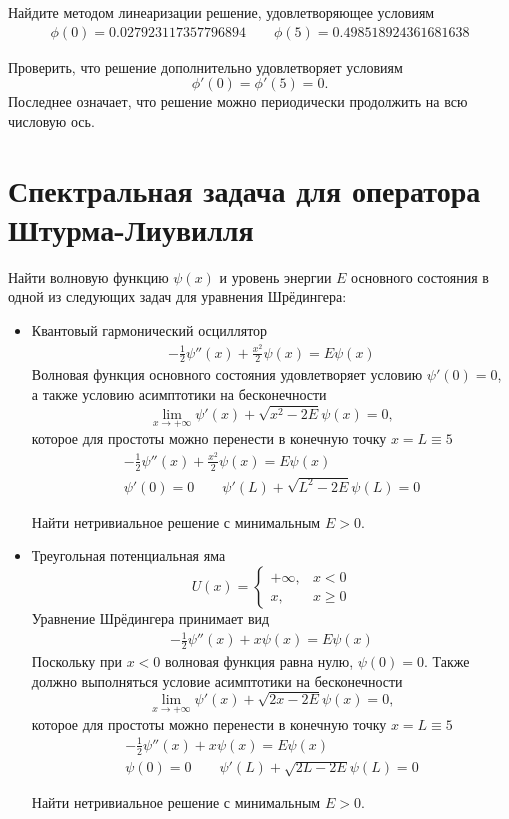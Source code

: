 \documentclass[10pt]{article}
\begin{document}
Найдите методом линеаризации решение, удовлетворяющее условиям
\begin{gather*}
\phi(0) = 0.027923117357796894 \qquad
\phi(5) = 0.498518924361681638
\end{gather*}

Проверить, что решение дополнительно удовлетворяет условиям \[\phi'(0) =
\phi'(5) = 0.\]
Последнее означает, что решение можно периодически продолжить на всю числовую
ось.

\section{Спектральная задача для оператора Штурма-Лиувилля}
Найти волновую функцию $\psi(x)$ и уровень энергии $E$ основного состояния в одной из следующих
задач для уравнения Шрёдингера:
\begin{itemize}
\item Квантовый гармонический осциллятор
\begin{gather*}
-\frac{1}{2}\psi''(x) + \frac{x^2}{2} \psi(x) = E\psi(x)
\end{gather*}
Волновая функция основного состояния удовлетворяет условию $\psi'(0) = 0$, а
также условию асимптотики на бесконечности
\[
\lim_{x\rightarrow +\infty} \psi'(x) + \sqrt{x^2 - 2E} \psi(x) = 0,
\]
которое для простоты можно перенести в конечную точку $x = L \equiv 5$
\begin{gather*}
-\frac{1}{2}\psi''(x) + \frac{x^2}{2} \psi(x) = E\psi(x)\\
\psi'(0) = 0\qquad
\psi'(L) + \sqrt{L^2 - 2E} \psi(L) = 0
\end{gather*}

Найти нетривиальное решение с минимальным $E > 0$.
\item Треугольная потенциальная яма
\[
U(x) = 
\begin{cases}
+\infty, &x < 0\\
x, &x \geq 0
\end{cases}
\]
Уравнение Шрёдингера принимает вид
\begin{gather*}
-\frac{1}{2}\psi''(x) + x \psi(x) = E\psi(x)
\end{gather*}
Поскольку при $x < 0$ волновая функция равна нулю, $\psi(0) = 0$.
Также должно выполняться условие асимптотики на бесконечности
\[
\lim_{x\rightarrow +\infty} \psi'(x) + \sqrt{2x - 2E} \psi(x) = 0,
\]
которое для простоты можно перенести в конечную точку $x = L \equiv 5$
\begin{gather*}
-\frac{1}{2}\psi''(x) + x \psi(x) = E\psi(x)\\
\psi(0) = 0\qquad
\psi'(L) + \sqrt{2L - 2E} \psi(L) = 0
\end{gather*}

Найти нетривиальное решение с минимальным $E > 0$.

\end{itemize}
\end{document}
